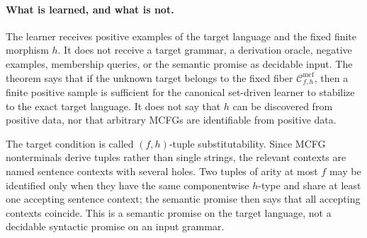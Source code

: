 \documentclass[11pt,a4paper]{article}
\theoremstyle{remark}
\newcommand{\Cmcf}[2]{\mathcal{C}^{\mathrm{mcf}}_{#1,#2}}
\begin{document}
\paragraph{What is learned, and what is not.}
The learner receives positive examples of the target language and the fixed
finite morphism \(h\).  It does not receive a target grammar, a derivation
oracle, negative examples, membership queries, or the semantic promise as
decidable input.  The theorem says that if the unknown target belongs to the
fixed fiber \(\Cmcf{f}{h}\), then a finite positive sample is sufficient for the
canonical set-driven learner to stabilize to the exact target language.  It does
not say that \(h\) can be discovered from positive data, nor that arbitrary
MCFGs are identifiable from positive data.

The target condition is called \((f,h)\)-tuple substitutability.  Since MCFG
nonterminals derive tuples rather than single strings, the relevant contexts are
named sentence contexts with several holes.  Two tuples of arity at most \(f\)
may be identified only when they have the same componentwise \(h\)-type and
share at least one accepting sentence context; the semantic promise then says
that all accepting contexts coincide.  This is a semantic promise on the target
language, not a decidable syntactic promise on an input grammar.
\end{document}
